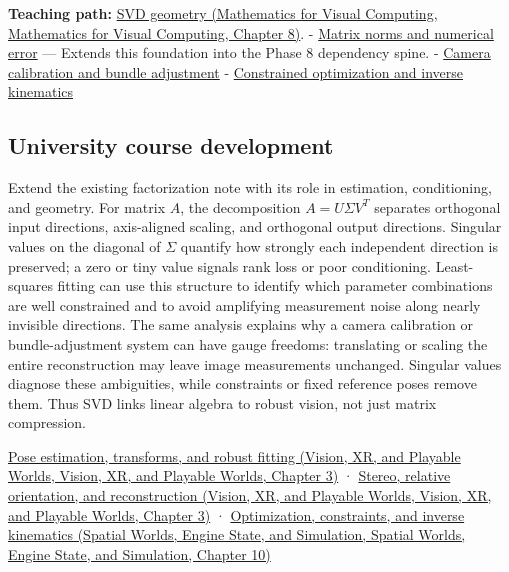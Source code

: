 \textbf{Teaching path:} \href{../02-Mathematics-for-Visual-Computing/main.pdf\#nameddest=02-foundations-ii-ch024-singular-value-decomposition-covers-every-rectangular-map}{SVD geometry (Mathematics for Visual Computing, Mathematics for Visual Computing, Chapter 8)}. - \hyperref[appendix-f8657bac66e5]{Matrix norms and numerical error} --- Extends this foundation into the Phase 8 dependency spine. - \hyperref[appendix-3ee9861904d5]{Camera calibration and bundle adjustment} - \hyperref[appendix-29f4bea4c2bb]{Constrained optimization and inverse kinematics}

\subsection{University course development}\label{appendix-1fad5e7f36fa-university-course-development}

Extend the existing factorization note with its role in estimation, conditioning, and geometry. For matrix \(A\), the decomposition \(A=U\Sigma V^T\) separates orthogonal input directions, axis-aligned scaling, and orthogonal output directions. Singular values on the diagonal of \(\Sigma\) quantify how strongly each independent direction is preserved; a zero or tiny value signals rank loss or poor conditioning. Least-squares fitting can use this structure to identify which parameter combinations are well constrained and to avoid amplifying measurement noise along nearly invisible directions. The same analysis explains why a camera calibration or bundle-adjustment system can have gauge freedoms: translating or scaling the entire reconstruction may leave image measurements unchanged. Singular values diagnose these ambiguities, while constraints or fixed reference poses remove them. Thus SVD links linear algebra to robust vision, not just matrix compression.

\href{../07-Vision-XR-and-Playable-Worlds/main.pdf\#nameddest=04-visual-computing-ii-ch032-pose-estimation-transforms-and-robust-fitting}{Pose estimation, transforms, and robust fitting (Vision, XR, and Playable Worlds, Vision, XR, and Playable Worlds, Chapter 3)} · \href{../07-Vision-XR-and-Playable-Worlds/main.pdf\#nameddest=04-visual-computing-ii-ch032-stereo-relative-orientation-and-reconstruction}{Stereo, relative orientation, and reconstruction (Vision, XR, and Playable Worlds, Vision, XR, and Playable Worlds, Chapter 3)} · \href{../05-Spatial-Worlds-Engine-State-and-Simulation/main.pdf\#nameddest=04-visual-computing-ii-ch029-optimization-constraints-and-inverse-kinematics}{Optimization, constraints, and inverse kinematics (Spatial Worlds, Engine State, and Simulation, Spatial Worlds, Engine State, and Simulation, Chapter 10)}
